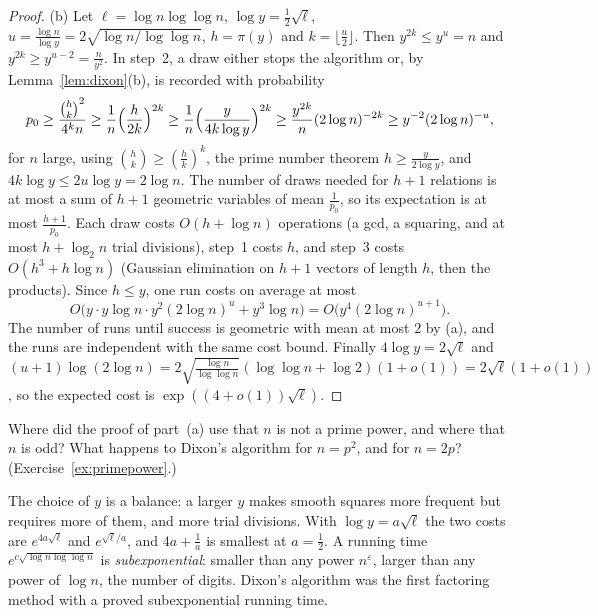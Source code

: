 \begin{proof}
(b) Let $\ell=\log n\log\log n$, $\log y=\frac12\sqrt\ell$, $u=\frac{\log n}{\log y}=2\sqrt{\log n/\log\log n}$, $h=\pi(y)$ and $k=\lfloor\frac u2\rfloor$. Then $y^{2k}\le y^u=n$ and $y^{2k}\ge y^{u-2}=\frac n{y^2}$. In step~2, a draw either stops the algorithm or, by Lemma~\ref{lem:dixon}(b), is recorded with probability
\[
p_0\ge\frac{\binom hk^2}{4^kn}\ge\frac1n\Bigl(\frac h{2k}\Bigr)^{2k}\ge\frac1n\Bigl(\frac y{4k\log y}\Bigr)^{2k}\ge\frac{y^{2k}}n(2\log n)^{-2k}\ge y^{-2}(2\log n)^{-u},
\]
for $n$ large, using $\binom hk\ge(\frac hk)^k$, the prime number theorem $h\ge\frac y{2\log y}$, and $4k\log y\le2u\log y=2\log n$. The number of draws needed for $h+1$ relations is at most a sum of $h+1$ geometric variables of mean $\frac1{p_0}$, so its expectation is at most $\frac{h+1}{p_0}$. Each draw costs $O(h+\log n)$ operations (a gcd, a squaring, and at most $h+\log_2n$ trial divisions), step~1 costs $h$, and step~3 costs $O(h^3+h\log n)$ (Gaussian elimination on $h+1$ vectors of length $h$, then the products). Since $h\le y$, one run costs on average at most
\[
O\bigl(y\cdot y\log n\cdot y^2(2\log n)^u+y^3\log n\bigr)=O\bigl(y^4(2\log n)^{u+1}\bigr).
\]
The number of runs until success is geometric with mean at most $2$ by (a), and the runs are independent with the same cost bound. Finally $4\log y=2\sqrt\ell$ and $(u+1)\log(2\log n)=2\sqrt{\frac{\log n}{\log\log n}}(\log\log n+\log2)(1+o(1))=2\sqrt\ell(1+o(1))$, so the expected cost is $\exp((4+o(1))\sqrt\ell)$.
\end{proof}

\begin{think}
Where did the proof of part~(a) use that $n$ is not a prime power, and where that $n$ is odd? What happens to Dixon's algorithm for $n=p^2$, and for $n=2p$? (Exercise~\ref{ex:primepower}.)
\end{think}

The choice of $y$ is a balance: a larger $y$ makes smooth squares more frequent but requires more of them, and more trial divisions. With $\log y=a\sqrt\ell$ the two costs are $e^{4a\sqrt\ell}$ and $e^{\sqrt\ell/a}$, and $4a+\frac1a$ is smallest at $a=\frac12$. A running time $e^{c\sqrt{\log n\log\log n}}$ is \emph{subexponential}: smaller than any power $n^\varepsilon$, larger than any power of $\log n$, the number of digits. Dixon's algorithm was the first factoring method with a proved subexponential running time.

